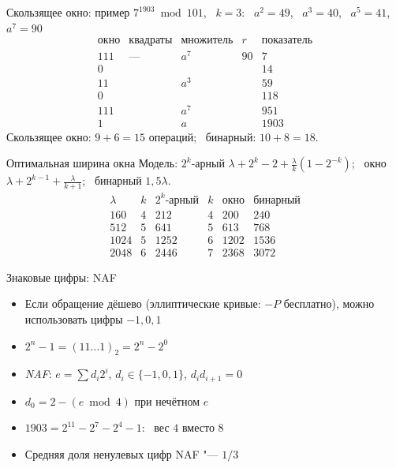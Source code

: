 \documentclass{ca-slides}
\begin{document}
\begin{canvasframe}{Скользящее окно: пример}
  $7^{1903} \bmod 101$, \ $k = 3$: \ $a^2 = 49$, \ $a^3 = 40$, \ $a^5 = 41$, \ $a^7 = 90$
  \[
  \begin{array}{c|l|c|r|r}
    \text{окно} & \text{квадраты} & \text{множитель} & r & \text{показатель} \\ \hline
    111 & \text{---} & a^7 & 90 & 7 \\
    0 & & & & 14 \\
    11 & & a^3 & & 59 \\
    0 & & & & 118 \\
    111 & & a^7 & & 951 \\
    1 & & a & & 1903
  \end{array}
  \]
  Скользящее окно: $9 + 6 = 15$ операций; \ бинарный: $10 + 8 = 18$.
  \penspace[0.1\textheight]
\end{canvasframe}

\begin{canvasframe}{Оптимальная ширина окна}
  \small
  Модель: $2^k$-арный $\lambda + 2^k - 2 + \frac{\lambda}{k}(1 - 2^{-k})$; \
  окно $\lambda + 2^{k-1} + \frac{\lambda}{k+1}$; \ бинарный $1{,}5\lambda$.
  \[
  \begin{array}{r|cc|cc|c}
    \lambda & k & 2^k\text{-арный} & k & \text{окно} & \text{бинарный} \\ \hline
    160 & 4 & 212 & 4 & 200 & 240 \\
    512 & 5 & 641 & 5 & 613 & 768 \\
    1024 & 5 & 1252 & 6 & 1202 & 1536 \\
    2048 & 6 & 2446 & 7 & 2368 & 3072
  \end{array}
  \]
  \penspace[0.12\textheight]
\end{canvasframe}

\begin{canvasframe}{Знаковые цифры: NAF}
  \begin{itemize}
    \item Если обращение дёшево (эллиптические кривые: $-P$ бесплатно), можно
      использовать цифры $-1, 0, 1$
    \item $2^n - 1 = (11\dots1)_2 = 2^n - 2^0$
    \item \emph{NAF}: $e = \sum d_i 2^i$, $d_i \in \{-1, 0, 1\}$, $d_i d_{i+1} = 0$
    \item $d_0 = 2 - (e \bmod 4)$ при нечётном $e$
    \item $1903 = 2^{11} - 2^7 - 2^4 - 1$: \ вес $4$ вместо $8$
    \item Средняя доля ненулевых цифр NAF "--- $1/3$
  \end{itemize}
  \penspace[0.12\textheight]
\end{canvasframe}
\end{document}
